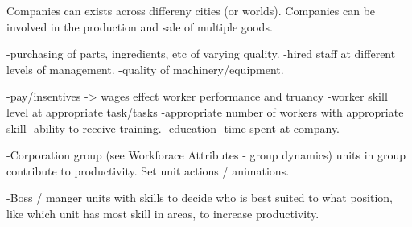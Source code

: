 

Companies can exists across differeny cities (or worlds).
Companies can be involved in the production and sale of multiple goods.




-purchasing of parts, ingredients, etc of varying quality.
-hired staff at different levels of management.
-quality of machinery/equipment.


-pay/insentives -> wages effect worker performance and truancy
-worker skill level at appropriate task/tasks
-appropriate number of workers with appropriate skill
-ability to receive training.
-education
-time spent at company.

-Corporation group (see Workforace Attributes - group dynamics) units in group contribute to productivity. Set unit actions / animations.

-Boss / manger units with skills to decide who is best suited to what position, like which unit has most skill in areas, to increase productivity. 





